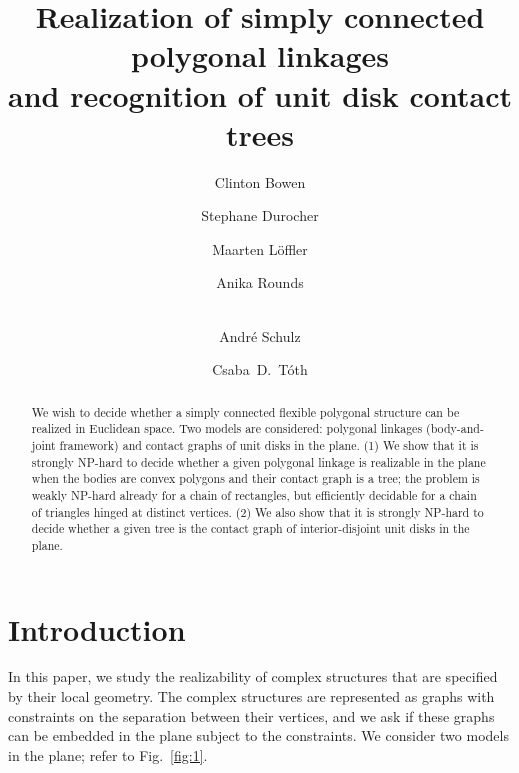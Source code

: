 \documentclass[runningheads]{article}
\title{Realization of simply connected polygonal linkages\\ and recognition of unit disk contact trees}
\author{Clinton Bowen\inst{1}
\and Stephane Durocher\inst{2}
\and Maarten L\"offler\inst{3}
\and Anika Rounds\inst{4}
\and\\
    Andr\'e Schulz\inst{5}
\and Csaba~D.~T\'oth\inst{1,4}}
\begin{document}

\begin{abstract}
We wish to decide whether a simply connected flexible polygonal structure can be realized in Euclidean space. Two models are considered: polygonal linkages (body-and-joint framework) and contact graphs of unit disks in the plane. (1) We show that it is strongly NP-hard to decide whether a given polygonal linkage is realizable in the plane when the bodies are convex polygons and their contact graph is a tree; the problem is weakly NP-hard already for a chain of rectangles, but efficiently decidable for a chain of triangles hinged at distinct vertices. (2) We also show that it is strongly NP-hard to decide whether a given tree is the contact graph of interior-disjoint unit disks in the plane.
\end{abstract}

\section{Introduction}\label{sec:intro}

In this paper, we study the realizability of complex structures that are specified by their local geometry.
The complex structures are represented as graphs with constraints on the separation between their vertices, and we ask if these graphs can be embedded in the plane subject to the constraints.
We consider two models in the plane; refer to Fig.~\ref{fig:1}.
\end{document}
